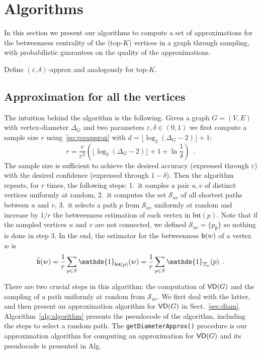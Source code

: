 \section{Algorithms}\label{sec:algo}
In this section we present our algorithms to compute a set of approximations for the
betweenness centrality of the (top-$K$) vertices in a graph through sampling,
with probabilistic guarantees on the quality of the approximations.

\XXX Define $(\varepsilon,\delta)$-approx and analogously for top-$K$.

\subsection{Approximation for all the vertices}\label{sec:allvertapprox}
The intuition behind the algorithm is the following. Given a graph $G=(V,E)$
with vertex-diameter $\Delta_G$ and two parameters $\varepsilon,\delta\in(0,1)$
we first compute a sample size $r$ using~\eqref{eq:vceapprox} with
$d=\lfloor\log_2(\Delta_G-2)\rfloor+1$:
\begin{equation}\label{eq:samplesize}
r=\frac{c}{\varepsilon^2}\left(\lfloor\log_2(\Delta_G-2)\rfloor+1+\ln\frac{1}{\delta}\right)\enspace.
\end{equation}
The sample size is sufficient to achieve the desired accuracy
(expressed through $\varepsilon$) with the desired confidence (expressed through
$1-\delta$). Then the algorithm repeats, for $r$ times, the following steps:
1.~it samples a pair $u,v$ of distinct vertices uniformly at random, 2.~it
computes the set $\mathcal{S}_{uv}$ of all shortest paths between $u$ and $v$,
3.~it selects a path $p$ from $\mathcal{S}_{uv}$ uniformly at random and
increase by $1/r$ the betweenness estimation of each vertex in
$\mathsf{Int}(p)$. Note that if the sampled vertices $u$ and $v$ are not
connected, we defined $\mathcal{S}_{uv}=\{p_\emptyset\}$ so nothing is done in
step 3. In the end, the estimator for the betweenness $\mathsf{b}(w)$ of a vertex $w$
is 
\[
\tilde\betw(w) = \frac{1}{r}\sum_{p\in S}
\mathds{1}_{\mathsf{Int}(p)}(w) = \frac{1}{r}\sum_{p\in S}
\mathds{1}_{\mathcal{T}_w}(p)\enspace.
\]

There are two crucial steps in this algorithm: the computation of $\mathsf{VD}(G)$ and
the sampling of a path uniformly at random from $\mathcal{S}_{uv}$. We first
deal with the latter, and then present an approximation algorithm for $\mathsf{VD}(G)$
in Sect.~\ref{sec:diam}. Algorithm~\ref{alg:algorithm} presents the
pseudocode of the algorithm, including the steps to select a random path.
The \texttt{getDiameterApprox()} procedure is our approximation algorithm for
computing an approximation for $\mathsf{VD}(G)$ and its pseudocode is presented in
Alg. \XXX %

